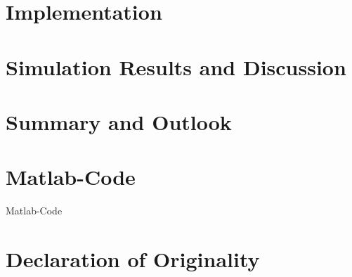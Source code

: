 \documentclass[11pt]{article}
\begin{document}
\section{Implementation}

\section{Simulation Results and Discussion}

\section{Summary and Outlook}

\appendix
\section{Matlab-Code}

Matlab-Code

\section{Declaration of Originality}





\end{document}
